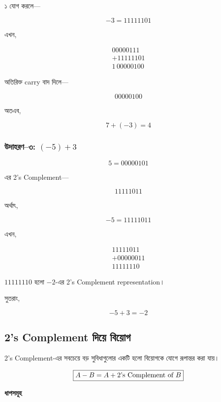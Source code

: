 ১ যোগ করলে—

\[
-3=11111101
\]

এখন,

\[
\begin{array}{r}
00000111\\
+11111101\\
\hline
1\,00000100
\end{array}
\]

অতিরিক্ত \textenglish{carry} বাদ দিলে—

\[
00000100
\]

অতএব,

\[
\boxed{7+(-3)=4}
\]

\subsubsection*{উদাহরণ--৩: $(-5)+3$}

\[
5=00000101
\]

এর \textenglish{2's Complement}—

\[
11111011
\]

অর্থাৎ,

\[
-5=11111011
\]

এখন,

\[
\begin{array}{r}
11111011\\
+00000011\\
\hline
11111110
\end{array}
\]

$11111110$ হলো $-2$-এর
\textenglish{2's Complement representation}।

সুতরাং,

\[
\boxed{-5+3=-2}
\]


\subsection{\textenglish{2's Complement} দিয়ে বিয়োগ}

\textenglish{2's Complement}-এর সবচেয়ে বড় সুবিধাগুলোর একটি হলো
বিয়োগকে যোগে রূপান্তর করা যায়।

\[
\boxed{
A-B
=
A+
\text{\textenglish{2's Complement of }}B
}
\]

\par\begingroup

\textbf{ধাপসমূহ}

